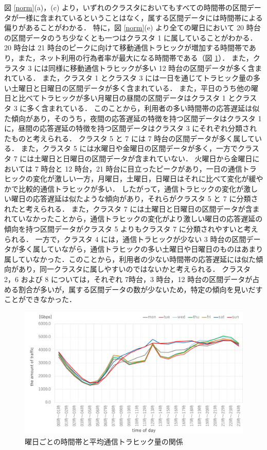 \documentclass[technicalreport]{ieicej}
\begin{document}
図 \ref{norm}(a)，(c) より，いずれのクラスタにおいてもすべての時間帯の区間データが一様に含まれているということはなく，属する区間データには時間帯による偏りがあることがわかる．
特に，図 \ref{norm}(e) より全ての曜日において 20 時台の区間データのうち少なくとも一つはクラスタ 1 に属していることがわかる．
20 時台は 21 時台のピークに向けて移動通信トラヒックが増加する時間帯であり\cite{soumutrafficstatics}，また，ネット利用の行為者率が最大になる時間帯である\cite{soumuwhitepaper}（図 \ref{traffic}）．
また，クラスタ 3 には同様に移動通信トラヒックが多い 12 時台の区間データが多く含まれている．
また，クラスタ 1 とクラスタ 3 には一日を通じてトラヒック量の多い土曜日と日曜日の区間データが多く含まれている．
また，平日のうち他の曜日と比べてトラヒックが多い月曜日の昼間の区間データはクラスタ 1 とクラスタ 3 に多く含まれている．
このことから，利用者の多い時間帯の応答遅延は似た傾向があり，そのうち，夜間の応答遅延の特徴を持つ区間データはクラスタ 1 に，昼間の応答遅延の特徴を持つ区間データはクラスタ 3 にそれぞれ分類されたものと考えられる．
クラスタ 5 と 7 には 7 時台の区間データが多く属している．
また，クラスタ 5 には水曜日や金曜日の区間データが多く，一方でクラスタ 7 には土曜日と日曜日の区間データが含まれていない．
火曜日から金曜日においては 7 時台と 12 時台，21 時台に目立ったピークがあり，一日の通信トラヒックの変化が激しい一方，月曜日，土曜日，日曜日はそれに比べて変化が緩やかで比較的通信トラヒックが多い．
したがって，通信トラヒックの変化が激しい曜日の応答遅延は似たような傾向があり，それらがクラスタ 5 と 7 に分類されたと考えられる．
また，クラスタ 7 には土曜日と日曜日の区間データが含まれていなかったことから，通信トラヒックの変化がより激しい曜日の応答遅延の傾向を持つ区間データがクラスタ 5 よりもクラスタ 7 に分類されやすいと考えられる．
一方で，クラスタ 4 には，通信トラヒックが少ない 3 時台の区間データが多く属していながら，通信トラヒックの多い土曜日や日曜日のものはあまり属していなかった．このことから，利用者の少ない時間帯の応答遅延には似た傾向があり，同一クラスタに属しやすいのではないかと考えられる．
クラスタ 2，6 および 8 については，それぞれ 7時台，3 時台，12 時台の区間データが占める割合が多いが，属する区間データの数が少ないため，特定の傾向を見いだすことができなかった．

\begin{figure}[tb]
\centering
\includegraphics[width = 0.85\hsize]{traffic.pdf}
\caption{曜日ごとの時間帯と平均通信トラヒック量の関係}
\label{traffic}
\end{figure}
\end{document}
